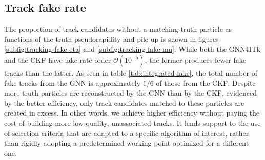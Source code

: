 \subsection{Track fake rate}
\label{subsect:tracking-fake}

The proportion of track candidates without a matching truth particle as functions of the truth pseudorapidity and pile-up is shown in figures  \ref{subfig:tracking-fake-eta} and \ref{subfig:tracking-fake-mu}. 
While both the GNN4ITk and the CKF have fake rate order $\mathcal{O}(10^{-5})$, the former produces fewer fake tracks than the latter.
As seen in table \ref{tab:integrated-fake}, the total number of fake tracks from the GNN is approximately $1/6$ of those from the CKF.
Despite more truth particles are reconstructed by the GNN than by the CKF, evidenced by the better efficiency, only track candidates matched to these particles are created in excess. 
In other words, we achieve higher efficiency without paying the cost of building more low-quality, unassociated tracks. 
It lends support to the use of selection criteria that are adapted to a specific algorithm of interest, rather than rigidly adopting a predetermined working point optimized for a different one. 

